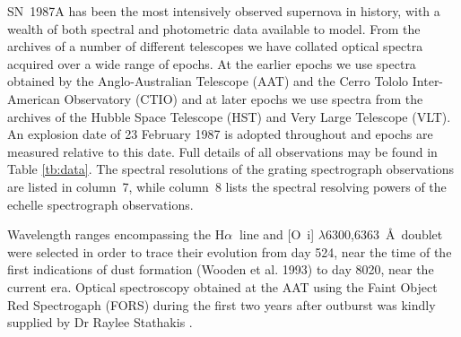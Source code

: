 \documentclass[useAMS,usenatbib,usegraphicx]{mnras}
\begin{document}
SN~1987A has been the most intensively observed supernova in history, with 
a wealth of both spectral and photometric data available to model.  From 
the archives of a number of different telescopes we have collated optical 
spectra acquired over a wide range of epochs.  At the earlier epochs we 
use spectra obtained by the Anglo-Australian Telescope (AAT) and the Cerro 
Tololo Inter-American Observatory (CTIO) and at later epochs we 
use spectra from the archives of the Hubble Space Telescope (HST) and Very 
Large Telescope (VLT).  An explosion date of 23 February 1987 is adopted 
throughout and epochs are measured relative to this date.  Full details of 
all observations may be found in Table \ref{tb:data}. The spectral 
resolutions of the grating spectrograph observations are listed in 
column~7, while column~8 lists the spectral resolving powers of the 
echelle spectrograph observations.

Wavelength ranges encompassing the H$\alpha\ $ line and [O~{\sc i}] 
$\lambda$6300,6363~\AA\ doublet were selected in order to trace their 
evolution from day 524, near the time of the first indications of dust 
formation (Wooden et al. 1993) to day 8020, near the current era. Optical 
spectroscopy obtained at the AAT using the Faint Object Red Spectrogaph 
(FORS) during the first two years after outburst was kindly supplied by Dr Raylee 
Stathakis \citep{Spyromilio1991, Spyromilio1993, Hanuschik1993}.
\end{document}
